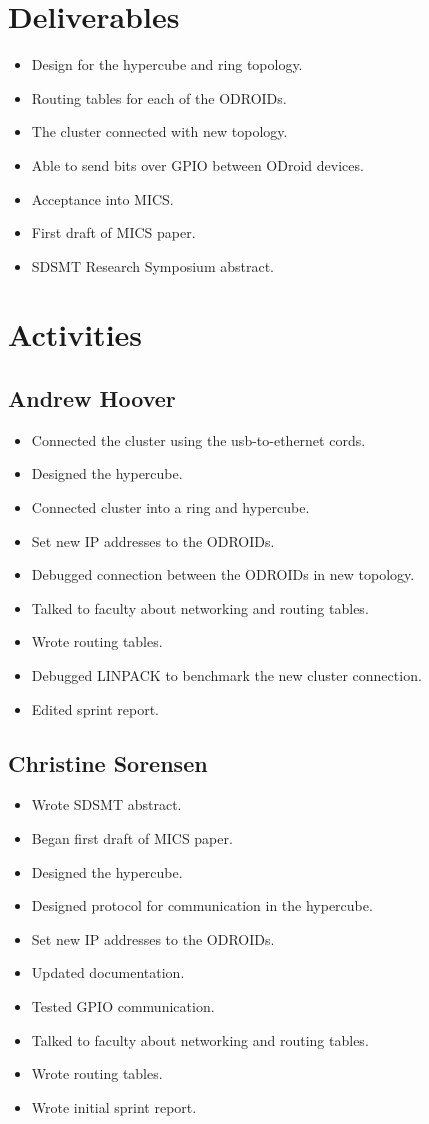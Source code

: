 \documentclass{article}
\begin{document}
\section*{Deliverables}
\begin{itemize}
	\item Design for the hypercube and ring topology.
	\item Routing tables for each of the ODROIDs.
	\item The cluster connected with new topology.
	\item Able to send bits over GPIO between ODroid devices.
	\item Acceptance into MICS.
	\item First draft of MICS paper.
	\item SDSMT Research Symposium abstract.
\end{itemize}

\section*{Activities}

\subsection*{Andrew Hoover}
\begin{itemize}
	\item Connected the cluster using the usb-to-ethernet cords.
	\item Designed the hypercube.
	\item Connected cluster into a ring and hypercube.
	\item Set new IP addresses to the ODROIDs.
	\item Debugged connection between the ODROIDs in new topology.
	\item Talked to faculty about networking and routing tables.
	\item Wrote routing tables.
	\item Debugged LINPACK to benchmark the new cluster connection.
	\item Edited sprint report.
\end{itemize}
\subsection*{Christine Sorensen}
\begin{itemize}
	\item Wrote SDSMT abstract.
	\item Began first draft of MICS paper.
	\item Designed the hypercube.
	\item Designed protocol for communication in the hypercube.
	\item Set new IP addresses to the ODROIDs.
	\item Updated documentation.
	\item Tested GPIO communication.
	\item Talked to faculty about networking and routing tables.
	\item Wrote routing tables.	
	\item Wrote initial sprint report.
\end{itemize}
\end{document}
